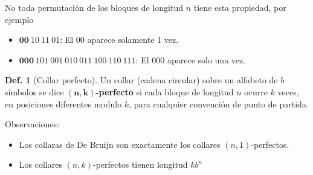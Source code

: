\documentclass{report}
\theoremstyle{definition} %
\newtheorem{definition}{Def.}
\begin{document}
No toda permutación de los bloques de longitud $n$ tiene esta propiedad, por ejemplo

\begin{itemize}
    \item $\bm{00}\ 10\ 11\ 01$: El $00$ aparece solamente 1 vez.
    \item $\bm{000}\ 101\ 001\ 010\ 011\ 100\ 110\ 111$: El $000$ aparece solo una vez.
\end{itemize}

\begin{definition}[Collar perfecto]
    Un collar (cadena circular) sobre un alfabeto de $b$ símbolos se dice $\bm{(n, k)}$\textbf{-perfecto} si cada bloque de longitud $n$ ocurre $k$ veces, en posiciones diferentes modulo $k$, para cualquier convención de punto de partida.
\end{definition}

Observaciones:

\begin{itemize}
    \item Los collaras de De Bruijn son exactamente los collares $(n, 1)$-perfectos.
    \item Los collares $(n, k)$-perfectos tienen longitud $k b^n$
\end{itemize}
\end{document}
